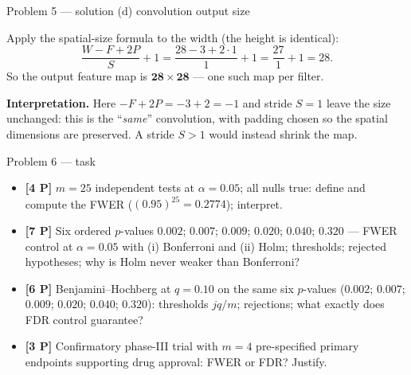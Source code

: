 \documentclass[aspectratio=169,11pt]{beamer}
\begin{document}
\begin{frame}{Problem 5 --- solution (d) convolution output size}
  \begin{solutionbox}[Solution P5(d) --- {$28\times28$} input; {$F=3$}; {$P=1$}; {$S=1$}]
    Apply the spatial-size formula to the width (the height is identical):
    \[
      \frac{W-F+2P}{S}+1=\frac{28-3+2\cdot1}{1}+1=\frac{27}{1}+1=28 .
    \]
    So the output feature map is $\mathbf{28\times28}$ --- one such map per filter.
    \medskip

    \textbf{Interpretation.} Here $-F+2P=-3+2=-1$ and stride $S=1$ leave the size unchanged: this
    is the ``\emph{same}'' convolution, with padding chosen so the spatial dimensions are
    preserved. A stride $S>1$ would instead shrink the map.
  \end{solutionbox}
\end{frame}

\begin{frame}{Problem 6 --- task}
  \begin{exercise}
    \begin{itemize}
      \item[(a)] \textbf{[4 P]} $m=25$ independent tests at $\alpha=0.05$; all nulls true:
        define and compute the FWER ($(0.95)^{25}=0.2774$); interpret.
      \item[(b)] \textbf{[7 P]} Six ordered $p$-values
        $0.002$; $0.007$; $0.009$; $0.020$; $0.040$; $0.320$ --- FWER control at $\alpha=0.05$
        with (i) Bonferroni and (ii) Holm; thresholds; rejected hypotheses; why is Holm never
        weaker than Bonferroni?
      \item[(c)] \textbf{[6 P]} Benjamini--Hochberg at $q=0.10$ on the same six $p$-values
        ($0.002$; $0.007$; $0.009$; $0.020$; $0.040$; $0.320$):
        thresholds $jq/m$; rejections; what exactly does FDR control guarantee?
      \item[(d)] \textbf{[3 P]} Confirmatory phase-III trial with $m=4$ pre-specified primary
        endpoints supporting drug approval: FWER or FDR? Justify.
    \end{itemize}
  \end{exercise}
  \vspace{2pt}{\scriptsize\itshape Lecture slides: Chapter 13 --- Multiple Testing (Lecture 12).}
\end{frame}
\end{document}

